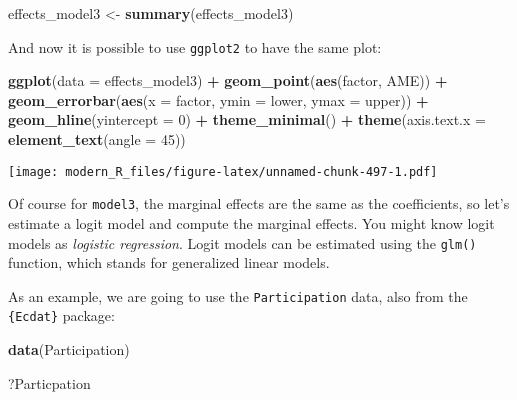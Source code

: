\documentclass[
]{article}
\newenvironment{Shaded}{\begin{snugshade}}{\end{snugshade}}
\newcommand{\DataTypeTok}[1]{\textcolor[rgb]{0.13,0.29,0.53}{#1}}
\newcommand{\DecValTok}[1]{\textcolor[rgb]{0.00,0.00,0.81}{#1}}
\newcommand{\KeywordTok}[1]{\textcolor[rgb]{0.13,0.29,0.53}{\textbf{#1}}}
\newcommand{\NormalTok}[1]{#1}
\newcommand{\OperatorTok}[1]{\textcolor[rgb]{0.81,0.36,0.00}{\textbf{#1}}}
\newcommand{\StringTok}[1]{\textcolor[rgb]{0.31,0.60,0.02}{#1}}
\begin{document}
\begin{Shaded}
\begin{Highlighting}[]
\NormalTok{effects\_model3 \textless{}{-}}\StringTok{ }\KeywordTok{summary}\NormalTok{(effects\_model3)}
\end{Highlighting}
\end{Shaded}

And now it is possible to use \texttt{ggplot2} to have the same plot:

\begin{Shaded}
\begin{Highlighting}[]
\KeywordTok{ggplot}\NormalTok{(}\DataTypeTok{data =}\NormalTok{ effects\_model3) }\OperatorTok{+}
\StringTok{  }\KeywordTok{geom\_point}\NormalTok{(}\KeywordTok{aes}\NormalTok{(factor, AME)) }\OperatorTok{+}
\StringTok{  }\KeywordTok{geom\_errorbar}\NormalTok{(}\KeywordTok{aes}\NormalTok{(}\DataTypeTok{x =}\NormalTok{ factor, }\DataTypeTok{ymin =}\NormalTok{ lower, }\DataTypeTok{ymax =}\NormalTok{ upper)) }\OperatorTok{+}
\StringTok{  }\KeywordTok{geom\_hline}\NormalTok{(}\DataTypeTok{yintercept =} \DecValTok{0}\NormalTok{) }\OperatorTok{+}
\StringTok{  }\KeywordTok{theme\_minimal}\NormalTok{() }\OperatorTok{+}
\StringTok{  }\KeywordTok{theme}\NormalTok{(}\DataTypeTok{axis.text.x =} \KeywordTok{element\_text}\NormalTok{(}\DataTypeTok{angle =} \DecValTok{45}\NormalTok{))}
\end{Highlighting}
\end{Shaded}

\texttt{[image: modern\_R\_files/figure-latex/unnamed-chunk-497-1.pdf]}

Of course for \texttt{model3}, the marginal effects are the same as the coefficients, so let's estimate a
logit model and compute the marginal effects. You might know logit models as \emph{logistic regression}.
Logit models can be estimated using the \texttt{glm()} function, which stands for generalized linear
models.

As an example, we are going to use the \texttt{Participation} data, also from the \texttt{\{Ecdat\}} package:

\begin{Shaded}
\begin{Highlighting}[]
\KeywordTok{data}\NormalTok{(Participation)}
\end{Highlighting}
\end{Shaded}

\begin{Shaded}
\begin{Highlighting}[]
\NormalTok{?Particpation}
\end{Highlighting}
\end{Shaded}
\end{document}
